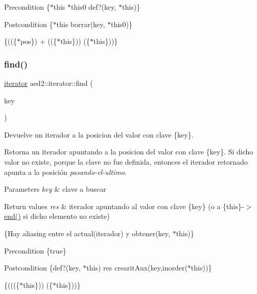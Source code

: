 \begin{DoxyPrecond}{Precondition}
\{$\ast$this  $\ast$this0  def?(key, $\ast$this)\} 
\end{DoxyPrecond}
\begin{DoxyPostcond}{Postcondition}
\{$\ast$this  borrar(key, $\ast$this0)\}
\end{DoxyPostcond}
\{((\{$\ast$pos\}) + ((\{$\ast$this\}))  (\{$\ast$this\}))\} \mbox{\label{classaed2_1_1iterator_a3d87256cbfc935a932677092ec57f49a}} 
\subsubsection{\texorpdfstring{find()}{find()}\hspace{0.1cm}{\footnotesize\ttfamily [1/2]}}
{\footnotesize\ttfamily \hyperlink{classaed2_1_1iterator_1_1iterator}{iterator} aed2\+::iterator\+::find (\begin{DoxyParamCaption}\item[{const Key \&}]{key }\end{DoxyParamCaption})\hspace{0.3cm}{\ttfamily [inline]}}



Devuelve un iterador a la posicion del valor con clave \{key\}. 

Retorna un iterador apuntando a la posicion del valor con clave \{key\}. Si dicho valor no existe, porque la clave no fue definida, entonces el iterador retornado apunta a la posición {\itshape pasando-\/el-\/ultimo}.


\begin{DoxyParams}{Parameters}
{\em key} & clave a buscar \\
\hline
\end{DoxyParams}

\begin{DoxyRetVals}{Return values}
{\em res} & iterador apuntando al valor con clave \{key\} (o a \{this\}-\/$>$\hyperlink{classaed2_1_1iterator_a67caf9468be999e9be96b7add5d79946}{end()} si dicho elemento no existe)\\
\hline
\end{DoxyRetVals}
\{Hay aliasing entre el actual(iterador) y obtener(key, $\ast$this)\}

\begin{DoxyPrecond}{Precondition}
\{true\} 
\end{DoxyPrecond}
\begin{DoxyPostcond}{Postcondition}
\{def?(key, $\ast$this)  res  crearit\+Aux(key,inorder($\ast$this))\}
\end{DoxyPostcond}
\{(((\{$\ast$this\}))  (\{$\ast$this\}))\}

